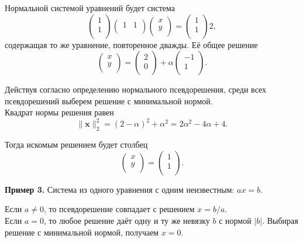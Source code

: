 \documentclass[11pt,a4paper]{article}
\begin{document}
Нормальной системой уравнений будет система \[
  \begin{pmatrix}
    1 \\
    1 \\
  \end{pmatrix}
  \begin{pmatrix}
    1 & 1 \\
  \end{pmatrix}
  \begin{pmatrix}
    x \\
    y \\
  \end{pmatrix}
  =
  \begin{pmatrix}
    1 \\
    1 \\
  \end{pmatrix}
  2,
\] содержащая то же уравнение, повторенное дважды. Её общее решение \[
  \begin{pmatrix}
    x \\
    y \\
  \end{pmatrix}
  =
  \begin{pmatrix}
    2 \\
    0 \\
  \end{pmatrix}
  + \alpha
  \begin{pmatrix}
    -1 \\
    1 \\
  \end{pmatrix}.
\]

Действуя согласно определению нормального псевдорешения, среди всех
псевдорешений выберем решение с минимальной нормой.\\
Квадрат нормы решения равен \[
  \|\mathbf{x}\|_2^2 = (2-\alpha)^2 + \alpha^2 = 2\alpha^2 - 4\alpha + 4.
\]

Тогда искомым решением будет столбец \[
  \begin{pmatrix}
    x \\
    y \\
  \end{pmatrix}
  =
  \begin{pmatrix}
    1 \\
    1 \\
  \end{pmatrix}.
\]

    \textbf{Пример 3.} Система из одного уравнения с одним неизвестным:
\(ax = b\).

Если \(a \ne 0\), то псевдорешение совпадает с решением \(x = b/a\).\\
Если \(a = 0\), то любое решение даёт одну и ту же невязку \(b\) с
нормой \(|b|\). Выбирая решение с минимальной нормой, получаем
\(x = 0\).
\end{document}
